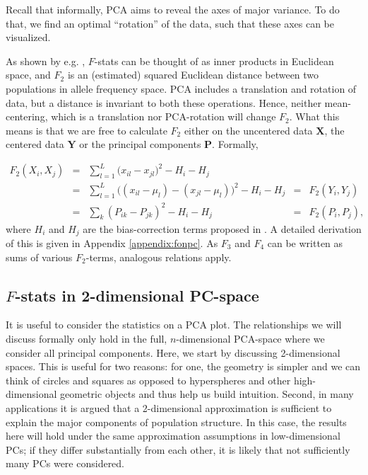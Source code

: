 \documentclass[10pt,a4paper]{article}
\newcommand{\MX}{\mathbf{X}} %
\newcommand{\MY}{\mathbf{Y}} %
\newcommand{\MP}{\mathbf{P}} %
\begin{document}
Recall that informally, PCA aims to reveal the axes of major variance. To do that, we find an optimal ``rotation'' of the data, such that these axes can be visualized. 

As shown by e.g. \cite{oteo-garcia2021}, $F$-stats can be thought of as inner products in Euclidean space, and $F_2$ is an (estimated) squared Euclidean distance between two populations in allele frequency space. PCA includes a translation and rotation of data, but a distance is invariant to both these operations. Hence, neither mean-centering, which is a translation nor PCA-rotation will change $F_2$. What this means is that we are free to calculate $F_2$ either on the uncentered data $\MX$, the centered data $\MY$ or the principal components $\MP$. Formally,

\begin{align}
F_2(X_i, X_j) &=&  \sum_{l=1}^L \big( x_{il} -x_{jl}\big)^2 - H_i - H_j &&\nonumber\\ 
 &=& \sum_{l=1}^L \big( (x_{il} - \mu_l) -(x_{jl} -\mu_l)\big)^2 - H_i - H_j  &=& F_2(Y_i, Y_j) \nonumber\\
 &=& \sum_k (P_{ik} - P_{jk})^2 - H_i - H_j &=& F_2(P_i, P_j) \text{,}
\end{align}
where $H_i$ and $H_j$ are the bias-correction terms proposed in \cite{reich2009}. A detailed derivation of this is given in Appendix \ref{appendix:fonpc}.
As $F_3$ and $F_4$ can be written as sums of various $F_2$-terms, analogous relations apply.

\subsection{$F$-stats in 2-dimensional PC-space}
 It is useful to consider the statistics on a PCA plot. The relationships we will discuss formally only hold in the full, $n$-dimensional PCA-space where we consider all principal components. Here, we start by discussing 2-dimensional spaces. This is useful for two reasons: for one, the geometry is simpler and we can think of circles and squares as opposed to hyperspheres and other high-dimensional geometric objects and thus help us build intuition. Second, in many applications it is argued that a 2-dimensional approximation is sufficient to explain the major components of population structure. In this case, the results here will hold under the same approximation assumptions in low-dimensional PCs; if they differ substantially from each other, it is likely that not sufficiently many PCs were considered.
\end{document}
